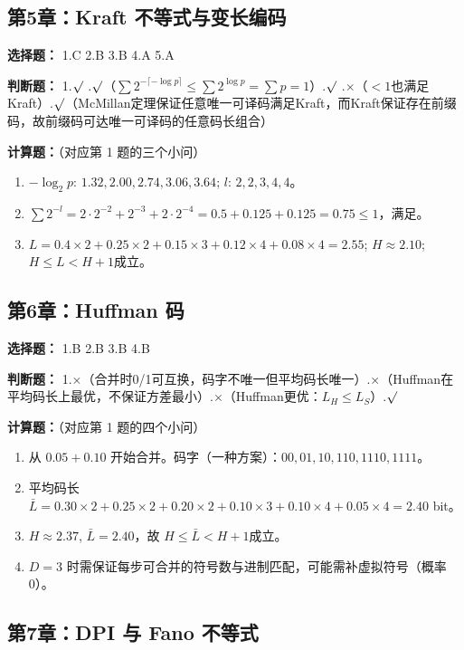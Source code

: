 \documentclass[12pt,a4paper]{ctexart}
\begin{document}
\subsection*{第5章：Kraft 不等式与变长编码}

\textbf{选择题：} 1.C \quad 2.B \quad 3.B \quad 4.A \quad 5.A

\textbf{判断题：} 1.$\surd$ .$\surd$（$\sum 2^{-\lceil-\log p\rceil}\leq\sum 2^{\log p}=\sum p=1$）.$\surd$ .$\times$（$<1$也满足Kraft）.$\surd$（McMillan定理保证任意唯一可译码满足Kraft，而Kraft保证存在前缀码，故前缀码可达唯一可译码的任意码长组合）

\textbf{计算题：}（对应第 1 题的三个小问）
\begin{enumerate}[leftmargin=*]
\item[(a)] $-\log_2 p$: $1.32, 2.00, 2.74, 3.06, 3.64$; $l$: $2,2,3,4,4$。
\item[(b)] $\sum 2^{-l}=2\cdot2^{-2}+2^{-3}+2\cdot2^{-4}=0.5+0.125+0.125=0.75\leq1$，满足。
\item[(c)] $L=0.4\times2+0.25\times2+0.15\times3+0.12\times4+0.08\times4=2.55$;
$H\approx2.10$; $H\leq L<H+1$成立。
\end{enumerate}

\subsection*{第6章：Huffman 码}

\textbf{选择题：} 1.B \quad 2.B \quad 3.B \quad 4.B

\textbf{判断题：} 1.$\times$（合并时0/1可互换，码字不唯一但平均码长唯一）.$\times$（Huffman在平均码长上最优，不保证方差最小）.$\times$（Huffman更优：$L_H\leq L_S$）.$\surd$

\textbf{计算题：}（对应第 1 题的四个小问）
\begin{enumerate}[leftmargin=*]
\item[(a)] 从 $0.05+0.10$ 开始合并。码字（一种方案）：$00, 01, 10, 110, 1110, 1111$。
\item[(b)] 平均码长 $\bar{L}=0.30\times2+0.25\times2+0.20\times2+0.10\times3+0.10\times4+0.05\times4=2.40$ bit。
\item[(c)] $H\approx2.37$, $\bar{L}=2.40$，故 $H\leq \bar{L}<H+1$成立。
\item[(d)] $D=3$ 时需保证每步可合并的符号数与进制匹配，可能需补虚拟符号（概率 0）。
\end{enumerate}

\subsection*{第7章：DPI 与 Fano 不等式}
\end{document}
